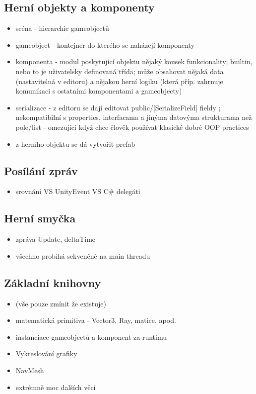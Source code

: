 \subsection{Herní objekty a komponenty}
\begin{itemize}
    \item scéna - hierarchie gameobjectů
    \item gameobject - kontejner do kterého se naházejí komponenty
    \item komponenta - modul poskytující objektu nějaký kousek funkcionality; builtin, nebo to je uživatelsky definovaná třída; může obsahovat nějaká data (nastavitelná v editoru) a nějakou herní logiku (která příp. zahrnuje komunikaci s ostatními komponentami a gameobjecty)
    \item serializace - z editoru se dají editovat public/[SerializeField] fieldy ; nekompatibilní s properties, interfacama a jinýma datovýma strukturama než pole/list - omezující když chce člověk používat klasické dobré OOP practices  
    \item z herního objektu se dá vytvořit prefab
\end{itemize}


\subsection{Posílání zpráv}
\begin{itemize}
    \item srovnání VS UnityEvent VS C\# delegáti 
\end{itemize}

\subsection{Herní smyčka}
\begin{itemize}
    \item zpráva Update, deltaTime
    \item všechno probíhá sekvenčně na main threadu
\end{itemize}

\subsection{Základní knihovny}
\begin{itemize}
    \item (vše pouze zmínit že existuje)
    \item matematická primitiva - Vector3, Ray, matice, apod.
    \item instanciace gameobjectů a komponent za runtimu
    \item Vykreslování grafiky
    \item NavMesh
    \item extrémně moc dalších věcí
\end{itemize}


